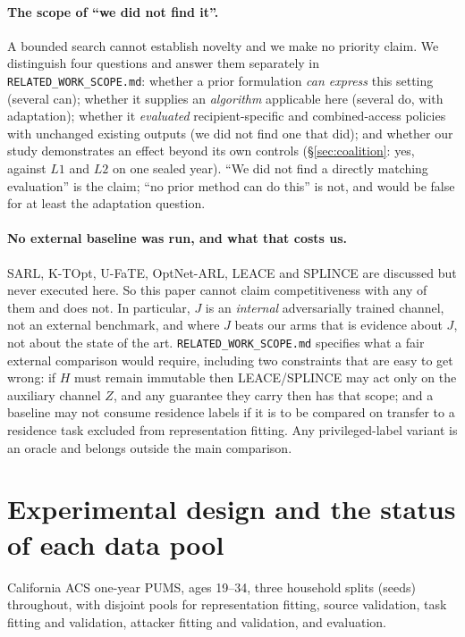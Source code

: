 \documentclass[10pt]{article}
\begin{document}
\paragraph{The scope of ``we did not find it''.} A bounded search cannot establish novelty and we
make no priority claim. We distinguish four questions and answer them separately in
\texttt{RELATED\_WORK\_SCOPE.md}: whether a prior formulation \emph{can express} this setting
(several can); whether it supplies an \emph{algorithm} applicable here (several do, with
adaptation); whether it \emph{evaluated} recipient-specific and combined-access policies with
unchanged existing outputs (we did not find one that did); and whether our study demonstrates an
effect beyond its own controls (\S\ref{sec:coalition}: yes, against $L1$ and $L2$ on one sealed
year). ``We did not find a directly matching evaluation'' is the claim; ``no prior method can do
this'' is not, and would be false for at least the adaptation question.

\paragraph{No external baseline was run, and what that costs us.} SARL, K-TOpt, U-FaTE, OptNet-ARL,
LEACE and SPLINCE are discussed but never executed here. So this paper cannot claim competitiveness
with any of them and does not. In particular, $J$ is an \emph{internal} adversarially trained
channel, not an external benchmark, and where $J$ beats our arms that is evidence about $J$, not
about the state of the art. \texttt{RELATED\_WORK\_SCOPE.md} specifies what a fair external
comparison would require, including two constraints that are easy to get wrong: if $H$ must remain
immutable then LEACE/SPLINCE may act only on the auxiliary channel $Z$, and any guarantee they
carry then has that scope; and a baseline may not consume residence labels if it is to be compared
on transfer to a residence task excluded from representation fitting. Any privileged-label variant
is an oracle and belongs outside the main comparison.

\section{Experimental design and the status of each data pool}
\label{sec:design}

California ACS one-year PUMS, ages 19--34, three household splits (seeds) throughout, with disjoint
pools for representation fitting, source validation, task fitting and validation, attacker fitting
and validation, and evaluation.
\end{document}
